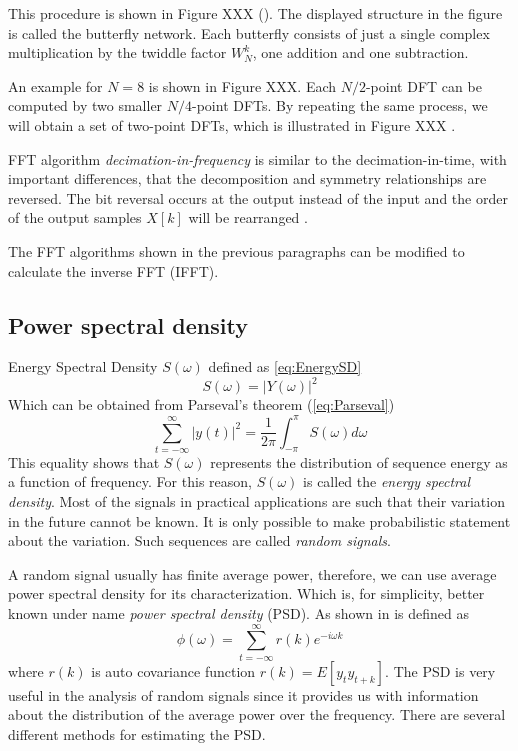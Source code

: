 \documentclass[twoside]{ctuthesis}
\theoremstyle{plain}
\theoremstyle{definition}
\theoremstyle{note}
\begin{document}
This procedure is shown in Figure XXX (\cite{cite:3}). The displayed structure in the figure is called the butterfly network. Each butterfly consists of just a single complex multiplication by the twiddle factor $W^{k}_{N}$, one addition and one subtraction. 

An example for $N=8$ is shown in Figure XXX. Each $N/2$-point DFT can be computed by two smaller $N/4$-point DFTs. By repeating the same process, we will obtain a set of two-point DFTs, which is illustrated in Figure XXX \cite{cite:RT_DSP}.

FFT algorithm \textit{decimation-in-frequency} is similar to the decimation-in-time, with important differences, that the decomposition and symmetry relationships are reversed. The bit reversal occurs at the output instead of the input and the order of the output samples $X[k]$ will be rearranged \cite{cite:RT_DSP}.

The FFT algorithms shown in the previous paragraphs can be modified to calculate the inverse FFT (IFFT).

\subsection{Power spectral density}
Energy Spectral Density $S(\omega)$ defined as \ref{eq:EnergySD}
\begin{equation} \label{eq:EnergySD}
S(\omega)=\left|Y(\omega)\right|^2
\end{equation}
Which can be obtained from Parseval's theorem (\ref{eq:Parseval})
\begin{equation} \label{eq:Parseval}
\sum_{t=-\infty}^{\infty}\left|y(t)\right|^2 = \frac{1}{2\pi}\int_{-\pi}^{\pi}S(\omega)d\omega
\end{equation}
This equality shows that $S(\omega)$ represents the distribution of sequence energy as a function of frequency. For this reason, $S(\omega)$ is called the \textit{energy spectral density}. 
Most of the signals in practical applications are such that their variation in the future cannot be known. It is only possible to make probabilistic statement about the variation. Such sequences are called \textit{random signals}. 

A random signal usually has finite average power, therefore, we can use average power spectral density for its characterization. Which is, for simplicity, better known under name \textit{power spectral density} (PSD). As shown in \cite{cite:SAoS} is defined as
\begin{equation} \label{eq:PSD1}
\phi(\omega) = \sum_{t=-\infty}^{\infty}r(k)e^{-i\omega k}
\end{equation}
where $r(k)$ is auto covariance function $r(k) = E[y_{t}y_{t+k}]$.
The PSD is very useful in the analysis of random signals since it provides us with information about the distribution of the average power over the frequency. There are several different methods for estimating the PSD. 
\end{document}
